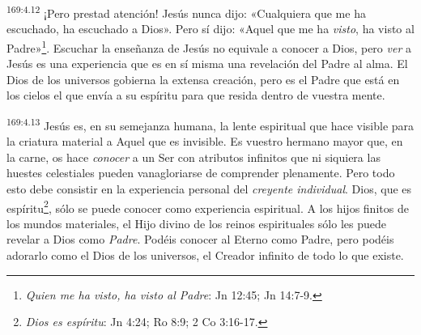 \par
\textsuperscript{169:4.12} ¡Pero prestad atención! Jesús nunca dijo: «Cualquiera que me ha escuchado, ha escuchado a Dios». Pero sí dijo: «Aquel que me ha \textit{visto}, ha visto al Padre»\footnote{\textit{Quien me ha visto, ha visto al Padre}: Jn 12:45; Jn 14:7-9.}. Escuchar la enseñanza de Jesús no equivale a conocer a Dios, pero \textit{ver} a Jesús es una experiencia que es en sí misma una revelación del Padre al alma. El Dios de los universos gobierna la extensa creación, pero es el Padre que está en los cielos el que envía a su espíritu para que resida dentro de vuestra mente.

\par
\textsuperscript{169:4.13} Jesús es, en su semejanza humana, la lente espiritual que hace visible para la criatura material a Aquel que es invisible. Es vuestro hermano mayor que, en la carne, os hace \textit{conocer} a un Ser con atributos infinitos que ni siquiera las huestes celestiales pueden vanagloriarse de comprender plenamente. Pero todo esto debe consistir en la experiencia personal del \textit{creyente individual}. Dios, que es espíritu\footnote{\textit{Dios es espíritu}: Jn 4:24; Ro 8:9; 2 Co 3:16-17.}, sólo se puede conocer como experiencia espiritual. A los hijos finitos de los mundos materiales, el Hijo divino de los reinos espirituales sólo les puede revelar a Dios como \textit{Padre}. Podéis conocer al Eterno como Padre, pero podéis adorarlo como el Dios de los universos, el Creador infinito de todo lo que existe.